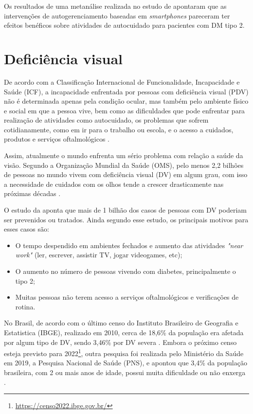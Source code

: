 Os resultados de uma metanálise realizada no estudo de  apontaram que as intervenções
de autogerenciamento baseadas em \emph{smartphones} pareceram ter efeitos benéficos sobre atividades de autocuidado para
pacientes com DM tipo 2.

\section{Deficiência visual}

De acordo com a Classificação Internacional de Funcionalidade, Incapacidade e Saúde (ICF),
a incapacidade enfrentada por pessoas com deficiência visual (PDV) não é determinada apenas
pela condição ocular, mas também pelo ambiente físico e social em que a pessoa vive, bem como
as dificuldades que pode enfrentar para realização de atividades como autocuidado, os problemas
que sofrem cotidianamente, como em ir para o trabalho ou escola, e o acesso a cuidados, produtos
e serviços oftalmológicos \cite{WHO2019}.

Assim, atualmente o mundo enfrenta um sério problema com relação a saúde da visão. Segundo a Organização Mundial da Saúde (OMS),
pelo menos 2,2 bilhões de pessoas no mundo vivem com deficiência visual (DV) em algum grau, com isso
a necessidade de cuidados com os olhos tende a crescer drasticamente nas próximas décadas \cite{WHO2019}.

O estudo da  aponta que mais de 1 bilhão dos casos de pessoas com DV poderiam ser prevenidos ou
tratados. Ainda segundo esse estudo, os principais motivos para esses casos são:

\begin{itemize}
    \item O tempo despendido em ambientes fechados e aumento das atividades \textit{"near work"} (ler, escrever, assistir TV, jogar videogames, etc);
    \item O aumento no número de pessoas vivendo com diabetes, principalmente o tipo 2;
    \item Muitas pessoas não terem acesso a serviços oftalmológicos e verificações de rotina.
\end{itemize}

No Brasil, de acordo com o último censo do Instituto Brasileiro de Geografia e Estatistica (IBGE), realizado em 2010,
cerca de 18,6\% da população era afetada por algum tipo de DV, sendo 3,46\% por DV severa
\cite{IBGE2012}. Embora o próximo censo esteja previsto para 2022\footnote{\url{https://censo2022.ibge.gov.br/}}, outra pesquisa
foi realizada pelo Ministério da Saúde em 2019, a Pesquisa Nacional de Saúde (PNS), e apontou que 3,4\% da população brasileira,
com 2 ou mais anos de idade, possui muita dificuldade ou não enxerga \cite{stopa2020pesquisa}.

